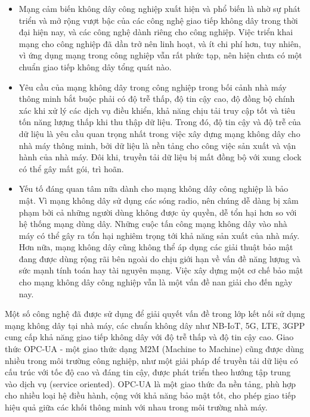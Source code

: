 \begin{itemize}

    
   \item Mạng cảm biến không dây công nghiệp xuất hiện và phổ biến là nhờ sự phát triển và mở rộng vượt bậc của các công nghệ giao tiếp không dây trong thời đại hiện nay, và các công nghệ dành riêng cho công nghiệp. Việc triển khai mạng cho công nghiệp đã dần trở nên linh hoạt, và ít chi phí hơn, tuy nhiên, vì ứng dụng mạng trong công nghiệp vẫn rất phức tạp, nên hiện chưa có một chuẩn giao tiếp không dây tổng quát nào.
    
   \item Yêu cầu của mạng không dây trong công nghiệp trong bối cảnh nhà máy thông minh bắt buộc phải có độ trễ thấp, độ tin cậy cao, độ đồng bộ chính xác khi xử lý các dịch vụ điều khiển, khả năng chịu tải truy cập tốt và tiêu tốn năng lượng thấp khi thu thập dữ liệu. Trong đó, độ tin cậy và độ trễ của dữ liệu là yêu cầu quan trọng nhất trong việc xây dựng mạng không dây cho nhà máy thông minh, bởi dữ liệu là nền tảng cho công việc sản xuất và vận hành của nhà máy. Đôi khi, truyền tải dữ liệu bị mất đồng bộ với xung clock có thể gây mất gói, trì hoãn.
    
    \item Yếu tố đáng quan tâm nữa dành cho mạng không dây công nghiệp là bảo mật. Vì mạng không dây sử dụng các sóng radio, nên chúng dễ dàng bị xâm phạm bởi cả những người dùng không được ủy quyền, dễ tổn hại hơn so với hệ thống mạng dùng dây. Những cuộc tấn công mạng không dây vào nhà máy có thể gây ra tổn hại nghiêm trọng tới khả năng sản xuất của nhà máy. Hơn nữa, mạng không dây cũng không thể áp dụng các giải thuật bảo mật đang được dùng rộng rãi bên ngoài do chịu giới hạn về vấn đề năng lượng và sức mạnh tính toán hay tài nguyên mạng. Việc xây dựng một cơ chế bảo mật cho mạng không dây công nghiệp vẫn là một vấn đề nan giải cho đến ngày nay.

\end{itemize}

    Một số công nghệ đã được sử dụng để giải quyết vấn đề trong lớp kết nối sử dụng mạng không dây tại nhà máy, các chuẩn không dây như NB-IoT, 5G, LTE, 3GPP cung cấp khả năng giao tiếp không dây với độ trễ thấp và độ tin cậy cao. 
    Giao thức OPC-UA - một giao thức dạng M2M (Machine to Machine) cũng được dùng nhiều trong môi trường công nghiệp, như một giải pháp để truyền tải dữ liệu có cấu trúc với tốc độ cao và đáng tin cậy, được phát triển theo hướng tập trung vào dịch vụ (service oriented). OPC-UA là một giao thức đa nền tảng, phù hợp cho nhiều loại hệ điều hành, cộng với khả năng bảo mật tốt, cho phép giao tiếp hiệu quả giữa các khối thông minh với nhau trong môi trường nhà máy. 


